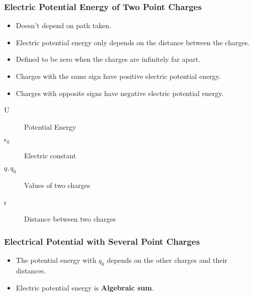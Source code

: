 \subsubsection{Electric Potential Energy of Two Point Charges}%
\label{ssub:electric_potential_energy_of_two_point_charges}

\begin{itemize}
	\item Doesn't depend on path taken.
	\item Electric potential energy only depends on the distance between the charges.
	\item Defined to be zero when the charges are infinitely far apart.
	\item Charges with the same sign have positive electric potential energy.
	\item Charges with opposite signs have negative electric potential energy.
\end{itemize}



\begin{description}
	\item[U] Potential Energy
	\item[$\epsilon_0$] Electric constant
	\item[$q,q_0$] Values of two charges
	\item[r] Distance between two charges
\end{description}

\subsubsection{Electrical Potential with Several Point Charges}%
\label{ssub:electrical_potential_with_several_point_charges}

\begin{itemize}
	\item The potential energy with $q_0$ depends on the other charges and their distances.
		\item Electric potential energy is \textbf{Algebraic sum}.
\end{itemize}


